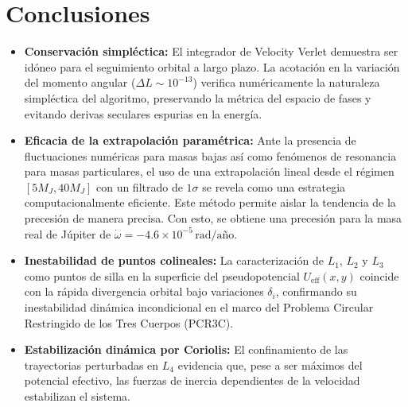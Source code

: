 \section{Conclusiones}

\begin{itemize}
    \item \textbf{Conservación simpléctica:} El integrador de Velocity Verlet demuestra ser idóneo para el seguimiento orbital a largo plazo. La acotación en la variación del momento angular ($\Delta L \sim 10^{-13}$) verifica numéricamente la naturaleza simpléctica del algoritmo, preservando la métrica del espacio de fases y evitando derivas seculares espurias en la energía.
    \item \textbf{Eficacia de la extrapolación paramétrica:} Ante la presencia de fluctuaciones numéricas para masas bajas así como fenómenos de resonancia para masas particulares, el uso de una extrapolación lineal desde el régimen $[5 M_J, 40 M_J]$ con un filtrado de $1 \sigma$ se revela como una estrategia computacionalmente eficiente. Este método permite aislar la tendencia de la precesión de manera precisa. Con esto, se obtiene una precesión para la masa real de Júpiter de $\dot{\omega} = -4.6 \times 10^{-5} \, \text{rad/año}$.
    \item \textbf{Inestabilidad de puntos colineales:} La caracterización de $L_1$, $L_2$ y $L_3$ como puntos de silla en la superficie del pseudopotencial $U_{\text{eff}}(x,y)$ coincide con la rápida divergencia orbital bajo variaciones $\delta_i$, confirmando su inestabilidad dinámica incondicional en el marco del Problema Circular Restringido de los Tres Cuerpos (PCR3C).
    \item \textbf{Estabilización dinámica por Coriolis:} El confinamiento de las trayectorias perturbadas en $L_4$ evidencia que, pese a ser máximos del potencial efectivo, las fuerzas de inercia dependientes de la velocidad estabilizan el sistema.
\end{itemize}


